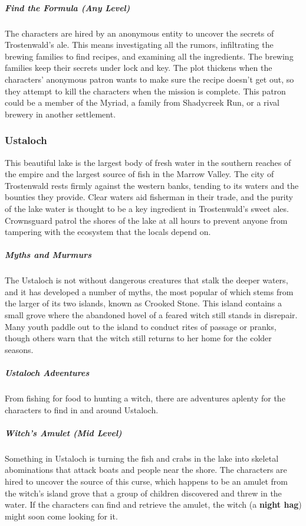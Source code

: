 \documentclass[10pt,a4paper,twoside,bg=print,twocolumn,openany,nodeprecatedcode]{dndbook}
\begin{document}
\subparagraph{Find the Formula (Any Level)}
The characters are hired by an anonymous entity to uncover the secrets of Trostenwald's ale. This means investigating all the rumors, infiltrating the brewing families to find recipes, and examining all the ingredients. The brewing families keep their secrets under lock and key. The plot thickens when the characters' anonymous patron wants to make sure the recipe doesn't get out, so they attempt to kill the characters when the mission is complete. This patron could be a member of the Myriad, a family from Shadycreek Run, or a rival brewery in another settlement.

\subsubsection{Ustaloch}
This beautiful lake is the largest body of fresh water in the southern reaches of the empire and the largest source of fish in the Marrow Valley. The city of Trostenwald rests firmly against the western banks, tending to its waters and the bounties they provide. Clear waters aid fisherman in their trade, and the purity of the lake water is thought to be a key ingredient in Trostenwald's sweet ales. Crownsguard patrol the shores of the lake at all hours to prevent anyone from tampering with the ecosystem that the locals depend on.

\subparagraph{Myths and Murmurs}
The Ustaloch is not without dangerous creatures that stalk the deeper waters, and it has developed a number of myths, the most popular of which stems from the larger of its two islands, known as Crooked Stone. This island contains a small grove where the abandoned hovel of a feared witch still stands in disrepair. Many youth paddle out to the island to conduct rites of passage or pranks, though others warn that the witch still returns to her home for the colder seasons.

\subparagraph{Ustaloch Adventures}
From fishing for food to hunting a witch, there are adventures aplenty for the characters to find in and around Ustaloch.

\subparagraph{Witch's Amulet (Mid Level)}
Something in Ustaloch is turning the fish and crabs in the lake into skeletal abominations that attack boats and people near the shore. The characters are hired to uncover the source of this curse, which happens to be an amulet from the witch's island grove that a group of children discovered and threw in the water. If the characters can find and retrieve the amulet, the witch (a \textbf{night hag}) might soon come looking for it.
\end{document}
